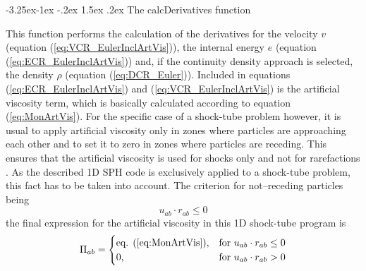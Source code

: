 \documentclass{report}
\makeatletter
\renewcommand\paragraph{\@startsection{paragraph}{4}{\z@}%
  {-3.25ex\@plus -1ex \@minus -.2ex}%
  {1.5ex \@plus .2ex}%
  {\normalfont\normalsize\bfseries}}
\makeatother
\begin{document}
\paragraph{The calcDerivatives function}

This function performs the calculation of the derivatives for the velocity $v$ (equation (\ref{eq:VCR_EulerInclArtVis})), the internal energy $e$ (equation (\ref{eq:ECR_EulerInclArtVis})) and, if the continuity density approach is selected, the density $\rho$ (equation (\ref{eq:DCR_Euler})). Included in equations (\ref{eq:ECR_EulerInclArtVis}) and (\ref{eq:VCR_EulerInclArtVis}) is the artificial viscosity term, which is basically calculated according to equation (\ref{eq:MonArtVis}). For the specific case of a shock-tube problem however, it is usual to apply artificial viscosity only in zones where particles are approaching each other and to set it to zero in zones where particles are receding. This ensures that the artificial viscosity is used for shocks only and not for rarefactions \cite{Monaghan2005}. As the described 1D SPH code is exclusively applied to a shock-tube problem, this fact has to be taken into account. 
The criterion for not--receding particles being 
\begin{equation}
 u_{ab}\cdot r_{ab}\leq 0
\end{equation}
the final expression for the artificial viscosity in this 1D shock-tube program is
\begin{equation}
\Pi_{ab}=\begin{cases}
\text{eq. (\ref{eq:MonArtVis})}, &  \text{for~} u_{ab}\cdot r_{ab}\leq 0 \\
0,&  \text{for~} u_{ab}\cdot r_{ab}> 0 
\end{cases}
\end{equation}
\end{document}
